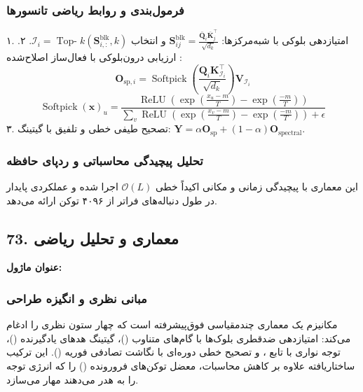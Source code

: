 \subsubsection*{فرمول‌بندی و روابط ریاضی تانسورها}
۱. امتیازدهی بلوکی با شبه‌مرکزها: $\mathbf{S}_{ij}^{\text{blk}} = \frac{\bar{\mathbf{Q}}_i \bar{\mathbf{K}}_j^\top}{\sqrt{d_k}}$ و انتخاب $\mathcal{I}_i = \operatorname{Top-}k(\mathbf{S}_{i, :}^{\text{blk}}, k)$.
۲. ارزیابی درون‌بلوکی با فعال‌ساز اصلاح‌شده :
\begin{equation}
\mathbf{O}_{\text{sp}, i} = \operatorname{Softpick}\left(\frac{\mathbf{Q}_i \mathbf{K}_{\mathcal{I}_i}^\top}{\sqrt{d_k}}\right) \mathbf{V}_{\mathcal{I}_i}
\end{equation}
\begin{equation}
\operatorname{Softpick}(\mathbf{x})_u = \frac{\operatorname{ReLU}\left(\exp\left(\frac{x_u - m}{T}\right) - \exp\left(\frac{-m}{T}\right)\right)}{\sum_v \operatorname{ReLU}\left(\exp\left(\frac{x_v - m}{T}\right) - \exp\left(\frac{-m}{T}\right)\right) + \epsilon}
\end{equation}
۳. تصحیح طیفی خطی و تلفیق با گیتینگ: $\mathbf{Y} = \alpha \mathbf{O}_{\text{sp}} + (1 - \alpha) \mathbf{O}_{\text{spectral}}$.

\subsubsection*{تحلیل پیچیدگی محاسباتی و ردپای حافظه}
این معماری با پیچیدگی زمانی و مکانی اکیداً خطی $\mathcal{O}(L)$ اجرا شده و عملکردی پایدار در طول دنباله‌های فراتر از ۴۰۹۶ توکن ارائه می‌دهد.


\subsection*{73. معماری و تحلیل ریاضی }
\textbf{عنوان ماژول:} 

\subsubsection*{مبانی نظری و انگیزه طراحی}
مکانیزم  یک معماری چندمقیاسی فوق‌پیشرفته است که چهار ستون نظری را ادغام می‌کند: امتیازدهی ضدقطری بلوک‌ها با گام‌های متناوب ()، گیتینگ هدهای یادگیرنده ()، توجه نواری با تابع ، و تصحیح خطی دوره‌ای با نگاشت تصادفی فوریه (). این ترکیب ساختاریافته علاوه بر کاهش محاسبات، معضل توکن‌های فرورونده () را که انرژی توجه را به هدر می‌دهند مهار می‌سازد.

